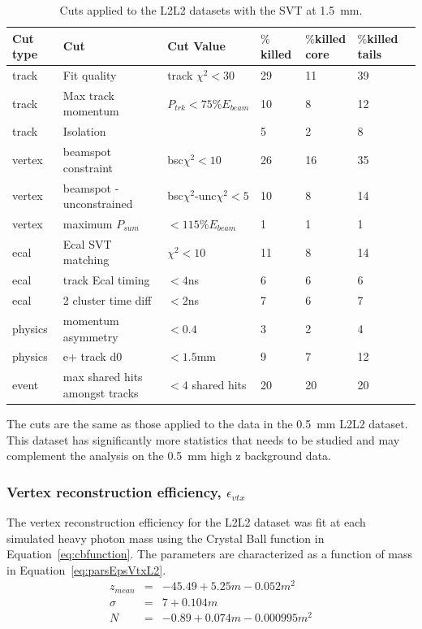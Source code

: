 \documentclass[twoside]{article}
\begin{document}
\begin{table}[H]
\caption{Cuts applied to the L2L2 datasets with the SVT at 1.5~mm.}
\label{l2l2_cuts_1p5}
\centering
\begin{tabular}{lllllll}
\toprule
Cut type & Cut & Cut Value &  $\%$killed &  $\%$killed core & $\%$killed tails\\
\midrule
track & Fit quality & track $\chi^{2}<30$ & 29 & 11 & 39 \\
track & Max track momentum &  $P_{trk}<75\%E_{beam}$ & 10 & 8 & 12 \\
track & Isolation &   & 5 & 2 & 8 \\
vertex & beamspot constraint & bsc$\chi^{2}<10$  & 26 & 16 & 35 \\
vertex & beamspot - unconstrained & bsc$\chi^{2}$-unc$\chi^2<5$  & 10 & 8 & 14 \\
vertex & maximum $P_{sum}$ &  $<115\%E_{beam}$ & 1 & 1 & 1 \\
ecal & Ecal SVT matching & $\chi^2<10$  & 11 & 8 & 14 \\
ecal & track Ecal timing & $<4$ns  & 6 & 6 & 6 \\
ecal & 2 cluster time diff & $<2$ns  & 7 & 6 & 7 \\
physics & momentum asymmetry & $<0.4$  & 3 & 2 & 4 \\
physics & e+ track d0 & $<1.5$mm  & 9 & 7 & 12 \\
event & max shared hits amongst tracks & $<4$ shared hits  & 20 & 20 & 20 \\
\bottomrule
\end{tabular}
\end{table}

The cuts are the same as those applied to the data in the 0.5~mm L2L2 dataset. This dataset has significantly more statistics that needs to be studied and may complement the analysis on the 0.5~mm high z background data. 

\subsubsection{Vertex reconstruction efficiency, $\epsilon_{vtx}$}
The vertex reconstruction efficiency for the L2L2 dataset was fit at each simulated heavy photon mass using the Crystal Ball function in Equation~\eqref{eq:cbfunction}. The parameters are characterized as a function of mass in Equation~\eqref{eq:parsEpsVtxL2}.
\begin{eqnarray*}
\label{eq:parsEpsVtxL2}
z_{mean} & = & -45.49+5.25m-0.052m^2 \\
\sigma & = & 7+0.104m \\
N & = & -0.89+0.074m-0.000995m^2 \\
\end{eqnarray*}
\end{document}
